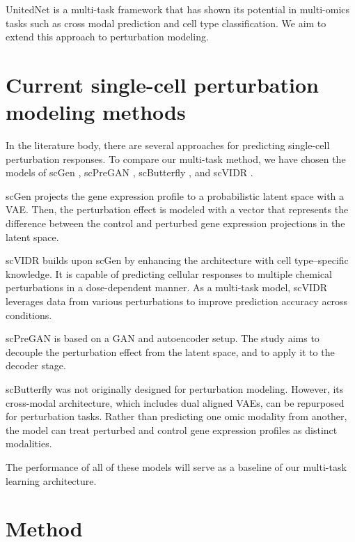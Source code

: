 \documentclass[12pt, a4paper]{article}
\begin{document}
UnitedNet \cite{tangExplainableMultitaskLearning2023} is a multi-task framework that has shown its potential in multi-omics tasks such as cross modal prediction and cell type classification. We aim to extend this approach to perturbation modeling.


\section{Current single-cell perturbation modeling methods}

In the literature body, there are several approaches for predicting single-cell perturbation responses. To compare our multi-task method, we have chosen the models of scGen \cite{lotfollahiScGenPredictsSinglecell2019}, scPreGAN \cite{weiScPreGANDeepGenerative2022}, scButterfly \cite{caoScButterflyVersatileSinglecell2024}, and scVIDR \cite{kanaGenerativeModelingSinglecell2023}.

scGen projects the gene expression profile to a probabilistic latent space with a VAE. Then, the perturbation effect is modeled with a vector that represents the difference between the control and perturbed gene expression projections in the latent space.

scVIDR builds upon scGen by enhancing the architecture with cell type–specific knowledge. It is capable of predicting cellular responses to multiple chemical perturbations in a dose-dependent manner. As a multi-task model, scVIDR leverages data from various perturbations to improve prediction accuracy across conditions.

scPreGAN is based on a GAN and autoencoder setup. The study aims to decouple the perturbation effect from the latent space, and to apply it to the decoder stage.

scButterfly was not originally designed for perturbation modeling. However, its cross-modal architecture, which includes dual aligned VAEs, can be repurposed for perturbation tasks. Rather than predicting one omic modality from another, the model can treat perturbed and control gene expression profiles as distinct modalities.

The performance of all of these models will serve as a baseline of our multi-task learning architecture.


\section{Method}
\end{document}
